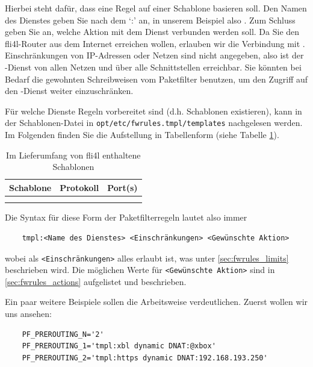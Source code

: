 Hierbei steht  dafür, dass eine Regel auf einer Schablone
basieren soll. Den Namen des Dienstes geben Sie nach dem `:'
an, in unserem Beispiel also . Zum Schluss geben Sie an, welche
Aktion mit dem Dienst verbunden werden soll. Da Sie den fli4l-Router
aus dem Internet erreichen wollen, erlauben wir die Verbindung mit
. Einschränkungen von IP-Adressen oder Netzen sind nicht
angegeben, also ist der -Dienst von allen Netzen und über alle
Schnittstellen erreichbar. Sie könnten bei Bedarf die gewohnten Schreibweisen
vom Paketfilter benutzen, um den Zugriff auf den -Dienst weiter
einzuschränken.

Für welche Dienste Regeln vorbereitet sind (d.h. Schablonen existieren),
kann in der Schablonen-Datei in \verb+opt/etc/fwrules.tmpl/templates+
nachgelesen werden. Im Folgenden finden Sie die Aufstellung in Tabellenform
(siehe Tabelle \ref{tab:fwrules_tmpl}).

\begin{center}
  {\footnotesize
  \begin{longtable}{|lll|}
     \hline
     {\textbf{Schablone}} & {\textbf{Protokoll}} & {\textbf{Port(s)}} \\
     \hline\hline
     \endhead
      \\
     \hline
     \caption{Im Lieferumfang von fli4l enthaltene Schablonen}
     \label{tab:fwrules_tmpl}
  \end{longtable}}
\end{center}

Die Syntax für diese Form der Paketfilterregeln lautet also immer

\begin{example}
\begin{verbatim}
    tmpl:<Name des Dienstes> <Einschränkungen> <Gewünschte Aktion>
\end{verbatim}
\end{example}

wobei als \verb+<Einschränkungen>+ alles erlaubt ist, was unter
\ref{sec:fwrules_limits} beschrieben wird. Die möglichen Werte für
\verb+<Gewünschte Aktion>+ sind in \ref{sec:fwrules_actions} aufgelistet und
beschrieben.

Ein paar weitere Beispiele sollen die Arbeitsweise verdeutlichen. Zuerst
wollen wir uns  ansehen:

\begin{example}
\begin{verbatim}
    PF_PREROUTING_N='2'
    PF_PREROUTING_1='tmpl:xbl dynamic DNAT:@xbox'
    PF_PREROUTING_2='tmpl:https dynamic DNAT:192.168.193.250'
\end{verbatim}
\end{example}

